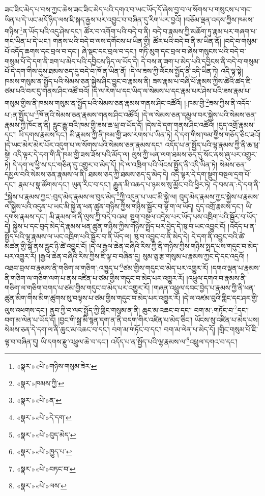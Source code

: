 ཟང་ཟིང་མེད་པ་བས་ཀྱང་ཆེས་ཟང་ཟིང་མེད་པའི་དགའ་བ་ཡང་ཡོད་དོ་ཞེས་བྱ་བ་ལ་སོགས་པ་གསུངས་པ་གང་ཡིན་པ་དེ་ཡང་མདོ་ཉིད་ལས་ཇི་སྐད་རྒྱས་པར་འབྱུང་བ་བཞིན་དུ་རིག་པར་བྱའོ། །བཅོམ་ལྡན་འདས་ཀྱིས་ཁམས་གཉིས་\footnote{«སྣར་»«པེ་»གཉིས་གསུམ་ཟེར་}ན་ཡོད་པའི་འདུ་ཤེས་དང་། ཚོར་བ་འགོག་པའི་བདེ་བ་ནི། བདེ་བ་རྣམས་ཀྱི་མཆོག་ཏུ་རྣམ་པར་གཞག་པ་གང་ཡིན་པ་དེ་ཡང་། གནས་པའི་བདེ་བ་ལས་དགོངས་པ་ཡིན་གྱི། ཚོར་པའི་བདེ་བ་ནི་མ་ཡིན་ནོ། །བདེ་བ་གསུམ་པོ་འདོད་ཆགས་དང་བྲལ་བ་དང་། ཞེ་སྡང་དང་བྲལ་བ་དང་། གཏི་མུག་དང་བྲལ་བ་ཞེས་གསུངས་པའི་བདེ་བ་གསུམ་པོ་དེ་དག་ནི་ཟག་པ་མེད་པའི་དབྱིངས་ཉིད་ལ་ཡོད་དེ། དེ་བས་ན་ཟག་པ་མེད་པའི་དབྱིངས་ནི་བདེ་བ་གསུམ་པོ་དེ་དག་གིས་དུས་ཐམས་ཅད་དུ་བདེ་བ་ཁོ་ན་ཡིན་ནོ། །དེ་ལ་ཟས་ཀྱི་ལོངས་སྤྱོད་ནི་འདི་ཡིན་ཏེ། འདི་ལྟ་སྟེ། ཁམས་གསུམ་ན་སྤྱོད་པའི་སེམས་ཅན་སྐྱེས་ཤིང་བྱུང་བ་རྣམས་ནི། ཟས་རྣམ་པ་བཞི་པོ་རྣམས་ཀྱིས་ཚེའི་ཚད་ཇི་ཙམ་པའི་བར་དུ་གནས་ཤིང་འཚོ་བའོ། །དེ་ལ་རེག་པ་དང་ཡིད་ལ་སེམས་པ་དང་རྣམ་པར་ཤེས་པའི་ཟས་རྣམ་པ་གསུམ་གྱིས་ནི་ཁམས་གསུམ་ན་སྤྱོད་པའི་སེམས་ཅན་རྣམས་གནས་ཤིང་འཚོའོ། །:ཁམ་གྱི་\footnote{«སྣར་»ཁམས་ཀྱི་}ཟས་ཀྱིས་ནི་འདོད་པ་:ན་སྤྱོད་པ་\footnote{«སྣར་»«པེ་»ན་}ཁོ་ནའི་སེམས་ཅན་རྣམས་གནས་ཤིང་འཚོའོ། །དེ་ལ་སེམས་ཅན་དམྱལ་བར་སྐྱེས་པའི་སེམས་ཅན་རྣམས་ཀྱི་ཁོང་ན་ནི། རླུང་རྒྱུ་བའི་ཁམ་གྱི་ཟས་ཆ་ཕྲ་བ་ཡོད་དོ། །དེས་དེ་དག་གནས་ཤིང་འཚོའོ། །དུད་འགྲོ་རྣམས་དང་། ཡི་དགས་རྣམས་དང་། མི་རྣམས་ཀྱི་ནི་ཁམ་གྱི་ཟས་རགས་པ་ཡིན་ཏེ། དེ་དག་གིས་ཁམ་གྱིས་གཅོད་ཅིང་ཟའོ། །དེ་ཡང་མེར་མེར་པོར་འདུག་པ་ལ་སོགས་པའི་སེམས་ཅན་རྣམས་དང་། འདོད་པ་ན་སྤྱོད་པའི་ལྷ་རྣམས་ཀྱི་ནི་ཆ་ཕྲ་སྟེ། འདི་ལྟར་དེ་དག་གི་ནི་ཁམ་གྱི་ཟས་ཟོས་པའི་མོད་ལ། ལུས་ཀྱི་ཡན་ལག་ཐམས་ཅད་དུ་སོང་ནས་ཞུ་པར་འགྱུར་ཏེ། དེ་དག་ལ་ཕྱི་ས་དང་གཅིན་དུ་འགྱུར་བ་མེད་དོ། །དེ་ལ་འཁྲིག་པའི་ལོངས་སྤྱོད་ནི་འདི་ཡིན་ཏེ། སེམས་ཅན་དམྱལ་བའི་སེམས་ཅན་རྣམས་ལ་ནི། ཐམས་ཅད་ཀྱི་ཐམས་ཅད་དུ་མེད་དེ། འདི་ལྟར་དེ་དག་སྡུག་བསྔལ་དྲག་པོ་དང་། རྣམ་པ་སྣ་ཚོགས་དང་། ཡུན་རིང་བ་དང་། རྒྱུན་མི་འཆད་པ་ཉམས་སུ་མྱོང་བའི་ཕྱིར་ཏེ། དེ་བས་ན་:དེ་དག་ནི་\footnote{«སྣར་»«པེ་»དེ་དག་}སྐྱེས་པ་རྣམས་ཀྱང་:བུད་མེད་རྣམས་ལ་བུད་མེད་\footnote{«སྣར་»«པེ་»བུད་མེད་}ཀྱི་འདུན་པ་ཡང་མི་སྐྱེ་ལ། བུད་མེད་རྣམས་ཀྱང་སྐྱེས་པ་རྣམས་ལ་སྐྱེས་པའི་འདུན་པ་ཡང་མི་སྐྱེ་ན་ཕན་ཚུན་གཉིས་ཀྱིས་གཉིས་སྦྱོར་བ་ལྟ་ག་ལ་ཡོད། དུད་འགྲོ་རྣམས་དང་། ཡི་དགས་རྣམས་དང་། མི་རྣམས་ལ་ནི་ལུས་ཀྱི་བདེ་བའམ། སྡུག་བསྔལ་འདྲེས་པར་ཡོད་པས་འཁྲིག་པའི་སྦྱོར་བ་ཡོད་དེ། སྐྱེས་པ་དང་བུད་མེད་དེ་རྣམས་ཕན་ཚུན་གཉིས་ཀྱིས་གཉིས་སྤྲོད་པར་བྱེད་དེ་ཁུ་བ་ཡང་འབྱུང་ངོ། །འདོད་པ་ན་སྤྱོད་པའི་ལྷ་རྣམས་ལ་ཡང་འཁྲིག་པའི་སྦྱོར་བ་ནི་ཡོད་ལ། ཁུ་བ་འབྱུང་བ་ནི་མེད་དེ། དེ་དག་ནི་འབྱུང་བའི་ཚེ་མཚན་གྱི་སྒོ་ནས་རླུང་ཉི་ཚེ་འབྱུང་ངོ། །དེ་ལ་རྒྱལ་ཆེན་བཞིའི་རིས་ཀྱི་ནི་གཉིས་ཀྱིས་གཉིས་སྤྲད་པས་གདུང་བ་མེད་པར་འགྱུར་རོ། །རྒྱལ་ཆེན་བཞིའི་རིས་ཀྱིས་ཇི་ལྟ་བ་བཞིན་དུ། སུམ་ཅུ་རྩ་གསུམ་པ་རྣམས་ཀྱང་དེ་དང་འདྲའོ། །འཐབ་བྲལ་བ་རྣམས་ནི་གཅིག་ལ་གཅིག་:འཁྱུད་པ་\footnote{«སྣར་»«པེ་»ཁྱུད་པ་}ཙམ་གྱིས་གདུང་བ་མེད་པར་འགྱུར་རོ། །དགའ་ལྡན་པ་རྣམས་ནི་གཅིག་ལ་གཅིག་ལག་པ་ནས་འཛིན་པ་ཙམ་གྱིས་གདུང་བ་མེད་པར་འགྱུར་རོ། །འཕྲུལ་དགའ་བ་རྣམས་ནི་གཅིག་ལ་གཅིག་བགད་པ་ཙམ་གྱིས་གདུང་བ་མེད་པར་འགྱུར་རོ། །གཞན་འཕྲུལ་དབང་བྱེད་པ་རྣམས་ཀྱི་ནི་ཕན་ཚུན་མིག་གིས་མིག་ཚུགས་སུ་བལྟས་པ་ཙམ་གྱིས་གདུང་བ་མེད་པར་འགྱུར་རོ། །དེ་ལ་འཛམ་བུའི་གླིང་དང་ཤར་གྱི་ལུས་འཕགས་དང་། ནུབ་ཀྱི་བ་ལང་སྤྱོད་ཀྱི་གླིང་གསུམ་ན་ནི། ཆུང་མ་འཆང་བ་དང་། བག་མ་:གཏོང་བ་\footnote{«སྣར་»«པེ་»བཏང་བ་}དང་། བག་མ་ལེན་པ་ཡོད་དོ། །བྱང་གི་སྒྲ་མི་སྙན་དག་ན་ནི་བདག་གིར་འཛིན་པ་མེད་ཅིང་། ཡོངས་སུ་འཛིན་པ་མེད་པས། སེམས་ཅན་དེ་དག་ལ་ནི་ཆུང་མ་འཆང་བ་དང་། བག་མ་གཏོང་བ་དང་། བག་མ་ལེན་པ་མེད་དོ། །གླིང་གསུམ་པོ་ཇི་ལྟ་བ་བཞིན་དུ། ཡི་དགས་རྫུ་འཕྲུལ་ཆེ་བ་དང་། འདོད་པ་ན་སྤྱོད་པའི་ལྷ་རྣམས་ལ་\footnote{«སྣར་»«པེ་»ལས་}འཕྲུལ་དགའ་བ་དང་། 